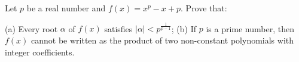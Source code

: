 Let $p$ be a real number and $f(x)=x^p-x+p$. Prove that:

(a) Every root $\alpha$ of $f(x)$ satisfies $|\alpha|<p^{\frac1{p-1}}$;
(b) If $p$ is a prime number, then $f(x)$ cannot be written as the product of two non-constant polynomials with integer coefficients.